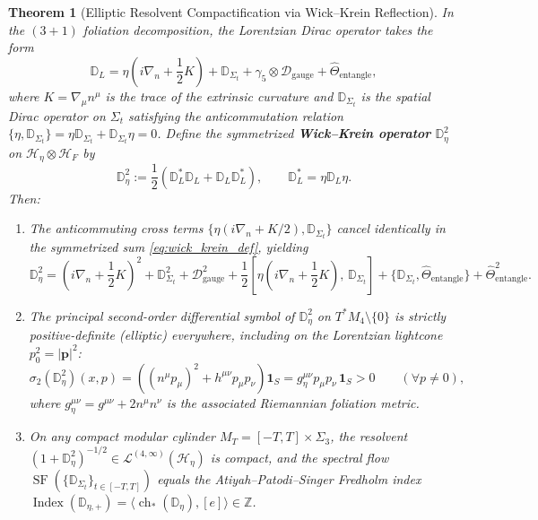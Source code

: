 \documentclass[11pt,a4paper]{article}
\theoremstyle{plain}
\newtheorem{theorem}{Theorem}[section]
\theoremstyle{definition}
\theoremstyle{remark}
\newcommand{\Ind}{\operatorname{Index}}
\newcommand{\SF}{\operatorname{SF}}
\newcommand{\Hilb}{\mathcal{H}}
\newcommand{\D}{\mathcal{D}}
\newcommand{\Z}{\mathbb{Z}}
\newcommand{\Dbb}{\mathbb{D}}
\begin{document}
\begin{theorem}[Elliptic Resolvent Compactification via Wick--Krein Reflection]
\label{thm:wick_krein}
In the $(3+1)$ foliation decomposition, the Lorentzian Dirac operator takes the form
\begin{equation}
  \Dbb_L = \eta \left( i \nabla_n + \frac{1}{2} K \right) + \Dbb_{\Sigma_t} + \gamma_5 \otimes \D_{\mathrm{gauge}} + \hat{\Theta}_{\mathrm{entangle}},
\end{equation}
where $K = \nabla_\mu n^\mu$ is the trace of the extrinsic curvature and $\Dbb_{\Sigma_t}$ is the spatial Dirac operator on $\Sigma_t$ satisfying the anticommutation relation $\{\eta, \Dbb_{\Sigma_t}\} = \eta \Dbb_{\Sigma_t} + \Dbb_{\Sigma_t} \eta = 0$. Define the symmetrized \textbf{Wick--Krein operator} $\Dbb_\eta^2$ on $\Hilb_\eta \otimes \Hilb_F$ by
\begin{equation}
  \label{eq:wick_krein_def}
  \Dbb_\eta^2 := \frac{1}{2} \left( \Dbb_L^* \Dbb_L + \Dbb_L \Dbb_L^* \right), \qquad \Dbb_L^* = \eta \Dbb_L \eta.
\end{equation}
Then:
\begin{enumerate}[label=(\roman*)]
  \item The anticommuting cross terms $\{\eta(i\nabla_n + K/2), \Dbb_{\Sigma_t}\}$ cancel identically in the symmetrized sum \eqref{eq:wick_krein_def}, yielding
  \begin{equation}
    \Dbb_\eta^2 = \left( i\nabla_n + \frac{1}{2} K \right)^2 + \Dbb_{\Sigma_t}^2 + \D_{\mathrm{gauge}}^2 + \frac{1}{2} \left[ \eta\left(i\nabla_n + \frac{1}{2}K\right), \, \Dbb_{\Sigma_t} \right] + \{\Dbb_{\Sigma_t}, \hat{\Theta}_{\mathrm{entangle}}\} + \hat{\Theta}_{\mathrm{entangle}}^2.
  \end{equation}
  \item The principal second-order differential symbol of $\Dbb_\eta^2$ on $T^*M_4 \setminus \{0\}$ is strictly positive-definite (elliptic) everywhere, including on the Lorentzian lightcone $p_0^2 = |\mathbf{p}|^2$:
  \begin{equation}
    \sigma_2(\Dbb_\eta^2)(x, p) = \left( (n^\mu p_\mu)^2 + h^{\mu\nu} p_\mu p_\nu \right) \mathbf{1}_S = g_\eta^{\mu\nu} p_\mu p_\nu \, \mathbf{1}_S > 0 \qquad (\forall p \neq 0),
  \end{equation}
  where $g_\eta^{\mu\nu} = g^{\mu\nu} + 2 n^\mu n^\nu$ is the associated Riemannian foliation metric.
  \item On any compact modular cylinder $M_T = [-T, T] \times \Sigma_3$, the resolvent $(1 + \Dbb_\eta^2)^{-1/2} \in \mathcal{L}^{(4,\infty)}(\Hilb_\eta)$ is compact, and the spectral flow $\SF(\{\Dbb_{\Sigma_t}\}_{t \in [-T,T]})$ equals the Atiyah--Patodi--Singer Fredholm index $\Ind(\Dbb_{\eta,+}) = \langle \operatorname{ch}_*(\Dbb_\eta), [e] \rangle \in \Z$.
\end{enumerate}
\end{theorem}
\end{document}
